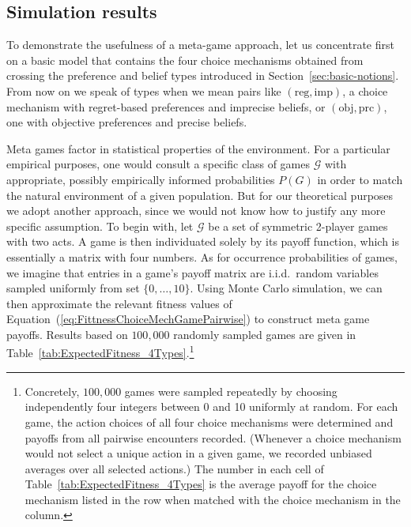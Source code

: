 \documentclass[fleqn,reqno,11pt]{article}
\begin{document}
\subsection{Simulation results}
\label{sec:simulation-results}

To demonstrate the usefulness of a meta-game approach, let us concentrate first on a basic
model that contains the four choice mechanisms obtained from crossing the preference and belief
types introduced in Section~\ref{sec:basic-notions}. From now on we speak of types when we mean
pairs like $(\text{reg}, \text{imp})$, a choice mechanism with regret-based preferences and
imprecise beliefs, or $(\text{obj}, \text{prc})$, one with objective preferences and precise
beliefs. 

Meta games factor in statistical properties of the environment. For a particular empirical
purposes, one would consult a specific class of games $\mathcal{G}$ with appropriate, possibly
empirically informed probabilities $P(G)$ in order to match the natural environment of a given
population. But for our theoretical purposes we adopt another approach, since we would not know
how to justify any more specific assumption. To begin with, let $\mathcal{G}$ be a set of
symmetric 2-player games with two acts. A game is then individuated solely by its payoff
function, which is essentially a matrix with four numbers. As for occurrence probabilities of
games, we imagine that entries in a game's payoff matrix are i.i.d.~random variables sampled
uniformly from set $ \lbrace 0, \dots, 10 \rbrace$.  Using Monte Carlo simulation, we can then
approximate the relevant fitness values of Equation~(\ref{eq:FittnessChoiceMechGamePairwise})
to construct meta game payoffs. Results based on $100,000$ randomly sampled games are given in
Table~\ref{tab:ExpectedFitness_4Types}.\footnote{Concretely, $100,000$ games were sampled
  repeatedly by choosing independently four integers between 0 and 10 uniformly at random. For
  each game, the action choices of all four choice mechanisms were determined and payoffs from
  all pairwise encounters recorded. (Whenever a choice mechanism would not select a unique
  action in a given game, we recorded unbiased averages over all selected actions.)  The number
  in each cell of Table~\ref{tab:ExpectedFitness_4Types} is the average payoff for the choice
  mechanism listed in the row when matched with the choice mechanism in the column.}
\end{document}

